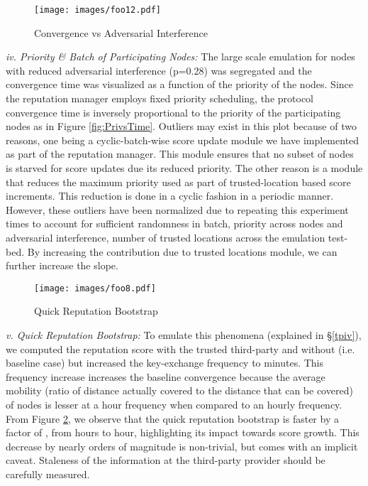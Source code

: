 \documentclass[letterpaper,twocolumn]{sig-alternate}
\begin{document}
\begin{figure}[h]
  \begin{center}
      \texttt{[image: images/foo12.pdf]}
    \end{center}
\vspace{-0.1in}
  \caption{\small{Convergence vs Adversarial Interference}}
  \label{fig:convadv}
 \vspace{-0.1in}
\end{figure}

\vspace{1mm}
{\em iv. Priority \& Batch of Participating Nodes:} The large scale emulation for  nodes with reduced adversarial interference (p=0.28) was segregated and the convergence time was visualized as a function of the priority of the nodes. Since the reputation manager employs fixed priority scheduling, the protocol convergence time is inversely proportional to the priority of the participating nodes as in Figure \ref{fig:PrivsTime}. Outliers may exist in this plot because of two reasons, one being a cyclic-batch-wise score update module we have implemented as part of the reputation manager. This module ensures that no subset of nodes is starved for score updates due its reduced priority. The other reason is a module that reduces the maximum priority used as part of trusted-location based score increments. This reduction is done in a cyclic fashion in a periodic manner. However, these outliers have been normalized due to repeating this experiment  times to account for sufficient randomness in batch, priority across nodes and adversarial interference, number of trusted locations across the emulation test-bed. By increasing the contribution due to trusted locations module, we can further increase the slope.  


\begin{figure}[h]
  \begin{center}
      \texttt{[image: images/foo8.pdf]}
    \end{center}
\vspace{-0.1in}
  \caption{\small{Quick Reputation Bootstrap}}
  \label{fig:qrb}
 \vspace{-0.1in}
\end{figure}


\vspace{1mm}
{\em v. Quick Reputation Bootstrap:} To emulate this phenomena (explained in \S \ref{tpiv}), we computed the reputation score with the trusted third-party and without (i.e. baseline case) but increased the key-exchange frequency to  minutes. This frequency increase increases the baseline convergence because the average mobility (ratio of distance actually covered to the distance that can be covered) of nodes is lesser at a  hour frequency when compared to an hourly frequency. From Figure \ref{fig:qrb}, we observe that the quick reputation bootstrap is faster by a factor of , from  hours to  hour, highlighting its impact towards score growth. This decrease by nearly  orders of magnitude is non-trivial, but comes with an implicit caveat. Staleness of the information at the third-party provider should be carefully measured.
\end{document}
